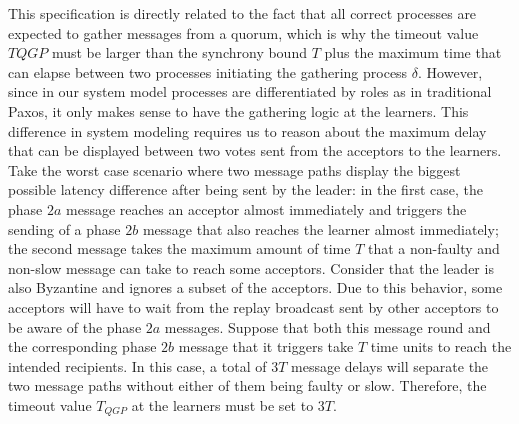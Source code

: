 This specification is directly related to the fact that all correct processes are expected to gather messages from a quorum, which is why the timeout value $T{QGP}$ must be larger than the synchrony bound $T$ plus the maximum time that can elapse between two processes initiating the gathering process $\delta$. However, since in our system model processes are differentiated by roles as in traditional Paxos, it only makes sense to have the gathering logic at the learners. This difference in system modeling requires us to reason about the maximum delay that can be displayed between two votes sent from the acceptors to the learners. Take the worst case scenario where two message paths display the biggest possible latency difference after being sent by the leader: in the first case, the phase $2a$ message reaches an acceptor almost immediately and triggers the sending of a phase $2b$ message that also reaches the learner almost immediately; the second message takes the maximum amount of time $T$ that a non-faulty and non-slow message can take to reach some acceptors. Consider that the leader is also Byzantine and ignores a subset of the acceptors. Due to this behavior, some acceptors will have to wait from the replay broadcast sent by other acceptors to be aware of the phase $2a$ messages. Suppose that both this message round and the corresponding phase $2b$ message that it triggers take $T$ time units to reach the intended recipients. In this case, a total of $3T$ message delays will separate the two message paths without either of them being faulty or slow. Therefore, the timeout value $T_{QGP}$ at the learners must be set to $3T$.